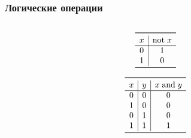 \documentclass[t,aspectratio=169]{beamer}
\begin{document}
\begin{frame}
    \frametitle{Логические операции}
    \begin{columns}
        \begin{column}{0.49\textwidth}
            \begin{minipage}{0.69\textwidth}
                \begin{equation*}
                    \begin{array}{c|c}
                        \toprule
                        x & \mathrm{not}\;x\\
                        \hline
                        0 & 1 \\
                        1 & 0 \\
                        \bottomrule
                    \end{array}
                \end{equation*}
            \end{minipage}
            \begin{minipage}{0.19\textwidth}
            \end{minipage}
            \par\vspace{1.0cm}
            \begin{minipage}{0.69\textwidth}
                \begin{equation*}
                    \begin{array}{c|c|c}
                        \toprule
                        x & y & x\;\mathrm{and}\;y \\
                        \hline
                        0 & 0 & 0 \\
                        1 & 0 & 0 \\
                        0 & 1 & 0 \\
                        1 & 1 & 1 \\
                        \bottomrule
                    \end{array}
                \end{equation*}
            \end{minipage}
            \begin{minipage}{0.19\textwidth}
            \end{minipage}
        \end{column}


\end{columns}
\end{frame}
\end{document}

